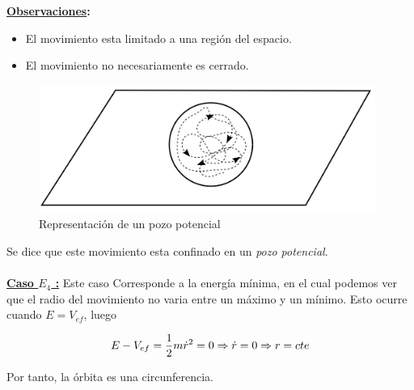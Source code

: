 \documentclass[12pt]{report}
\begin{document}
\textbf{\underline{Observaciones}:}

\begin{itemize}
\item El movimiento esta limitado a una región del espacio.
\item El movimiento no necesariamente es cerrado.
\end{itemize}


\begin{figure}[H]
	\begin{center}
	\includegraphics[width=11cm]{figura17.png} 
	\caption{ Representación de un pozo potencial}
	\label{fig36}
	\end{center}
\end{figure}

Se dice que este movimiento esta confinado en un \textit{pozo potencial}. \\
\\

\textbf{\underline{Caso $E_4$ :}} Este caso Corresponde a la energía mínima, en el cual podemos ver que  el radio del movimiento no varia entre un máximo y un mínimo. Esto ocurre cuando $E=V_{ef}$, luego

\begin{equation}
E-V_{ef}=\frac{1}{2} m \dot{r}^2 = 0 \\
\Rightarrow \dot{r}=0 \\
\Rightarrow r=cte
\end{equation}

Por tanto, la órbita es una circunferencia.
\end{document}
